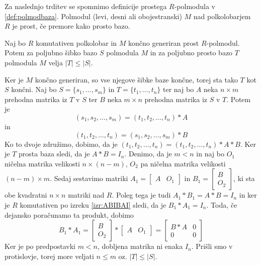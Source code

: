\documentclass[mat1]{fmfdelo}
\newcommand{\abs}[1]{\ensuremath{\lvert #1 \rvert}}
\begin{document}
Za naslednjo trditev se spomnimo definicije prostega $R$-polmodula v \ref{def:polmodbaza}. Polmodul (levi, desni ali obojestranski) $M$ nad polkolobarjem $R$ je prost, če premore kako prosto bazo.

\begin{trditev}\label{trd:kardprostvsneprostbaz}
	Naj bo $R$ komutativen polkolobar in $M$ končno generiran prost $R$-polmodul. Potem za poljubno šibko bazo $S$ polmodula $M$ in za poljubno prosto bazo $T$ polmodula $M$ velja $\abs{T}\leq\abs{S}$.
\end{trditev}

\begin{dokaz}
	Ker je $M$ končno generiran, so vse njegove šibke baze končne, torej sta tako $T$ kot $S$ končni. Naj bo $S = \{s_1,\ldots, s_m\}$ in $T =\{t_1, \ldots, t_n\}$ ter naj bo $A$ neka $n\times m$ prehodna matrika iz $T$ v $S$ ter $B$ neka $m\times n$ prehodna matrika iz $S$ v $T$. Potem je $$(s_1, s_2, \ldots, s_m) = (t_1, t_2, \ldots, t_n)*A$$ in $$(t_1, t_2, \ldots, t_n) = (s_1, s_2, \ldots, s_m)*B$$ Ko to dvoje združimo, dobimo, da je $(t_1, t_2, \ldots, t_n) = (t_1, t_2, \ldots, t_n)*A*B$. Ker je $T$ prosta baza sledi, da je $A*B = I_n$. Denimo, da je $m < n$ in naj bo $O_1$ ničelna matrika velikosti $n\times (n-m)$, $O_2$ pa ničelna matrika velikosti $(n-m)\times m$. Sedaj sestavimo matriki $A_1 = \begin{bmatrix}
A & O_1
\end{bmatrix}$ in $B_1 = \begin{bmatrix}
B \\
 O_2
\end{bmatrix}$, ki sta obe kvadratni $n\times n$ matriki nad $R$. Poleg tega je tudi $A_1*B_1 = A*B = I_n$ in ker je $R$ komutativen po izreku \ref{izr:ABIBAI} sledi, da je $B_1*A_1 = I_n$. Toda, če dejansko poračunamo ta produkt, dobimo $$B_1*A_1 = \begin{bmatrix}
B \\
O_2
\end{bmatrix} * \begin{bmatrix}
A & O_1
\end{bmatrix} = \begin{bmatrix}
B*A & 0 \\
0 & 0
\end{bmatrix}$$ Ker je po predpostavki $m < n$, dobljena matrika ni enaka $I_n$. Prišli smo v protislovje, torej more veljati $n \leq m$ oz. $\abs{T} \leq \abs{S}$.
\end{dokaz}
\end{document}
